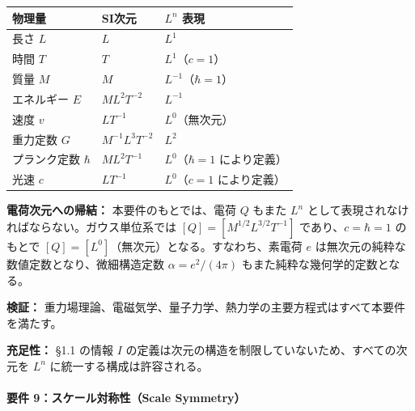 \documentclass[a4paper,11pt]{ltjsarticle}
\begin{document}
{\def\LTcaptype{none} %
\begin{longtable}[]{@{}
  >{\raggedright\arraybackslash}p{}
  >{\raggedright\arraybackslash}p{}
  >{\raggedright\arraybackslash}p{}@{}}
\toprule\noalign{}
\begin{minipage}[b]{\linewidth}\raggedright
物理量
\end{minipage} & \begin{minipage}[b]{\linewidth}\raggedright
SI次元
\end{minipage} & \begin{minipage}[b]{\linewidth}\raggedright
\(L^n\) 表現
\end{minipage} \\
\midrule\noalign{}
\endhead
\bottomrule\noalign{}
\endlastfoot
長さ \(L\) & \(L\) & \(L^1\) \\
時間 \(T\) & \(T\) & \(L^1\)（\(c = 1\)） \\
質量 \(M\) & \(M\) & \(L^{-1}\)（\(\hbar = 1\)） \\
エネルギー \(E\) & \(ML^2T^{-2}\) & \(L^{-1}\) \\
速度 \(v\) & \(LT^{-1}\) & \(L^0\)（無次元） \\
重力定数 \(G\) & \(M^{-1}L^3T^{-2}\) & \(L^2\) \\
プランク定数 \(\hbar\) & \(ML^2T^{-1}\) & \(L^0\)（\(\hbar = 1\)
により定義） \\
光速 \(c\) & \(LT^{-1}\) & \(L^0\)（\(c = 1\) により定義） \\
\end{longtable}
}

\textbf{電荷次元への帰結：} 本要件のもとでは、電荷 \(Q\) もまた \(L^n\)
として表現されなければならない。ガウス単位系では
\([Q] = [M^{1/2}L^{3/2}T^{-1}]\) であり、\(c = \hbar = 1\) のもとで
\([Q] = [L^0]\)（無次元）となる。すなわち、素電荷 \(e\)
は無次元の純粋な数値定数となり、微細構造定数 \(\alpha = e^2/(4\pi)\)
もまた純粋な幾何学的定数となる。

\textbf{検証：}
重力場理論、電磁気学、量子力学、熱力学の主要方程式はすべて本要件を満たす。

\textbf{充足性：} §1.1 の情報 \(I\)
の定義は次元の構造を制限していないため、すべての次元を \(L^n\)
に統一する構成は許容される。

\paragraph{要件 9：スケール対称性（Scale
Symmetry）}\label{ux8981ux4ef6-9ux30b9ux30b1ux30fcux30ebux5bfeux79f0ux6027scale-symmetry}
\end{document}
